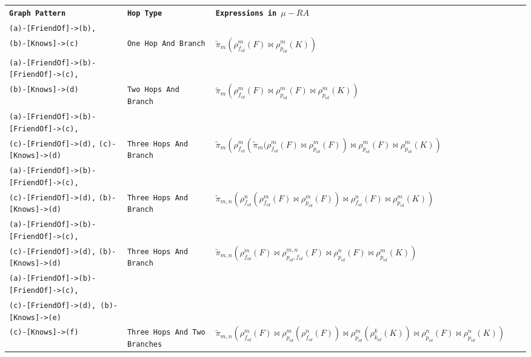 \documentclass{beamer}
\newcommand{\rename}[3]{\rho_{#1}^{#2}\left(#3\right)}
\newcommand{\drop}[2]{\widetilde{\pi}_{#1}\left(#2\right)}
\newcommand{\NJoin}{\bowtie}
\begin{document}
\begin{frame}

    \begin{table}[h]
      \resizebox{1.1\textwidth}{!}
      {%
      \begin{tabular}{lllll}
      \cline{1-3}
       \textbf{\texttt{Graph Pattern}} & \textbf{\texttt{Hop Type}}  & \textbf{\texttt{Expressions in $\mu-RA$}} &  &  \\ \cline{1-3}
       \texttt{(a)-[FriendOf]->(b),} \\ \texttt{(b)-[Knows]->(c)}& \texttt{One Hop And Branch} & $ \drop{m}{\rename {f_{id}} m F \NJoin \rename {p_{id}} m K} $ &  &  \\ \cline{1-3}
       \texttt{(a)-[FriendOf]->(b)-[FriendOf]->(c),} \\ \texttt{(b)-[Knows]->(d)}& \texttt{Two Hops And Branch} & $\drop{m}{\rename {f_{id}} m F \NJoin \rename {p_{id}} m F  \NJoin \rename {p_{id}} m K}$ &  &  \\ \cline{1-3}
       \texttt{(a)-[FriendOf]->(b)-[FriendOf]->(c),} \\ \texttt{(c)-[FriendOf]->(d),}  \texttt{(c)-[Knows]->(d)}& \texttt{Three Hops And Branch} & $ \drop{m}{\rename{f_{id}}{m}{\widetilde\pi_{m}(\rename {f_{id}} m F \NJoin \rename {p_{id}} m F} \NJoin \rename{p_{id}}{m}{F} \NJoin \rename{p_{id}}{m}{K}} $ &  &  \\ \cline{1-3}
       \texttt{(a)-[FriendOf]->(b)-[FriendOf]->(c),} \\ \texttt{(c)-[FriendOf]->(d),}  \texttt{(b)-[Knows]->(d)}& \texttt{Three Hops And Branch} & $ \drop{m,n}{\rename{f_{id}}{n}{\rename{f_{id}}{m}{F} \NJoin \rename{p_{id}}{m}{F}} \NJoin \rename{f_{id}}{n}{F} \NJoin \rename{p_{id}}{m}{K}} $ &  &  \\ \cline{1-3}
       \texttt{(a)-[FriendOf]->(b)-[FriendOf]->(c),} \\ \texttt{(c)-[FriendOf]->(d),}  \texttt{(b)-[Knows]->(d)}& \texttt{Three Hops And Branch} & $ \drop{m,n}{\rename{f_{id}}{m}{F} \NJoin \rename{p_{id}, f_{id}}{m,n}{F}   \NJoin \rename{p_{id}}{n}{F} \NJoin \rename{p_{id}}{m}{K}} $ &  &  \\ \cline{1-3}
       \texttt{(a)-[FriendOf]->(b)-[FriendOf]->(c),} \\ \texttt{(c)-[FriendOf]->(d), (b)-[Knows]->(e)} \\ \texttt{(c)-[Knows]->(f)} & \texttt{Three Hops And Two Branches} & $ \drop{m,n}{\rename{f_{id}}{m}{F} \NJoin \rename{p_{id}}{m}{\rename{f_{id}}{n}{F}} \NJoin \rename{p_{id}}{m}{\rename{k_{id}}{k}{K}} \NJoin \rename{p_{id}}{n}{F} \NJoin \rename{p_{id}}{n}{K}} $ && \\ \cline{1-3}

\end{tabular}}
\end{table}
\end{frame}
\end{document}
